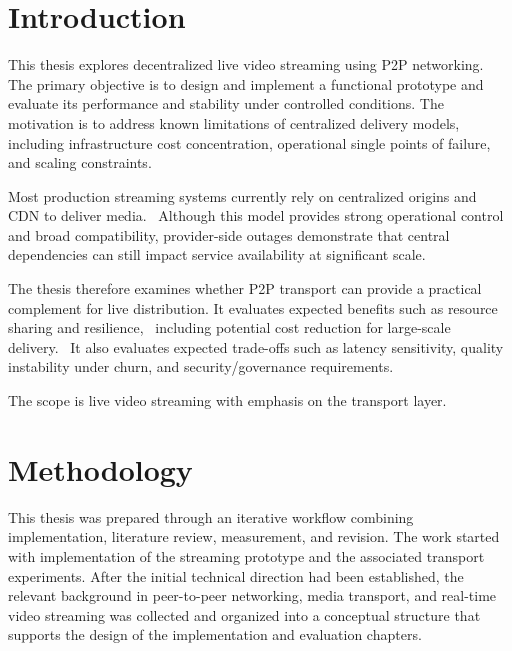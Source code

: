 \section{Introduction}
This thesis explores decentralized live video streaming using \ac{P2P} networking. The primary objective is to design and implement a functional prototype and evaluate its performance and stability under controlled conditions. The motivation is to address known limitations of centralized delivery models, including infrastructure cost concentration, operational single points of failure, and scaling constraints.~\cite{xuAnalysisCDNP2P2006,meskovicContentDeliveryArchitectures2012,peroniEndtoEndPipelinePerspective2025}

Most production streaming systems currently rely on centralized origins and \ac{CDN} to deliver media.~\cite{peroniEndtoEndPipelinePerspective2025} Although this model provides strong operational control and broad compatibility, provider-side outages demonstrate that central dependencies can still impact service availability at significant scale.~\cite{ServiceHealthNov}

The thesis therefore examines whether \ac{P2P} transport can provide a practical complement for live distribution. It evaluates expected benefits such as resource sharing and resilience,~\cite{xuAnalysisCDNP2P2006,meskovicContentDeliveryArchitectures2012} including potential cost reduction for large-scale delivery.~\cite{xuAnalysisCDNP2P2006,meskovicContentDeliveryArchitectures2012} It also evaluates expected trade-offs such as latency sensitivity, quality instability under churn, and security/governance requirements.~\cite{xuAnalysisCDNP2P2006,meskovicContentDeliveryArchitectures2012,SecurityConsiderations}

The scope is live video streaming with emphasis on the transport layer.

\section{Methodology}
This thesis was prepared through an iterative workflow combining implementation, literature review, measurement, and revision. The work started with implementation of the streaming prototype and the associated transport experiments. After the initial technical direction had been established, the relevant background in peer-to-peer networking, media transport, and real-time video streaming was collected and organized into a conceptual structure that supports the design of the implementation and evaluation chapters.

